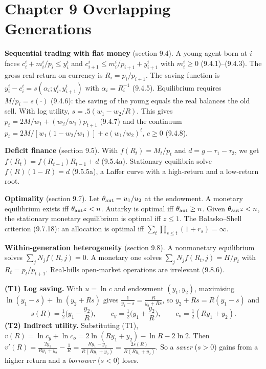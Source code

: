\documentclass[12pt, letterpaper]{article}
\begin{document}
\tableofcontents
\newpage

\section{Chapter 9 \quad Overlapping Generations}

\begin{tcolorbox}[theorybox,title={Chapter 9 Overview}]
\textbf{Sequential trading with fiat money} (section 9.4). A young agent born at $i$ faces
$c_i^i+m_i^i/p_i\le y_i^i$ and $c_{i+1}^i\le m_i^i/p_{i+1}+y_{i+1}^i$ with $m_i^i\ge0$ (9.4.1)--(9.4.3).
The gross real return on currency is $R_i=p_i/p_{i+1}$. The saving function is
$y_i^i-c_i^i=s(\alpha_i;y_i^i,y_{i+1}^i)$ with $\alpha_i=R_i^{-1}$ (9.4.5). Equilibrium requires
$M/p_i=s(\cdot)$ (9.4.6): the saving of the young equals the real balances the old sell. With log
utility, $s=.5(w_1-w_2/R)$. This gives $p_t=2M/w_1+(w_2/w_1)p_{t+1}$ (9.4.7) and the continuum
$p_t=2M/[w_1(1-w_2/w_1)]+c(w_1/w_2)^t$, $c\ge0$ (9.4.8).

\textbf{Deficit finance} (section 9.5). With $f(R_t)=M_t/p_t$ and $d=g-\tau_1-\tau_2$, we get
$f(R_t)=f(R_{t-1})R_{t-1}+d$ (9.5.4a). Stationary equilibria solve $f(R)(1-R)=d$ (9.5.5a), a Laffer
curve with a high-return and a low-return root.

\textbf{Optimality} (section 9.7). Let $\theta_{\rm aut}=u_1/u_2$ at the endowment. A monetary
equilibrium exists iff $\theta_{\rm aut}z<n$. Autarky is optimal iff $\theta_{\rm aut}\ge n$. Given
$\theta_{\rm aut}z<n$, the stationary monetary equilibrium is optimal iff $z\le1$. The Balasko--Shell
criterion (9.7.18): an allocation is optimal iff $\sum_t\prod_{s\le t}(1+r_s)=\infty$.

\textbf{Within-generation heterogeneity} (section 9.8). A nonmonetary equilibrium solves
$\sum_jN_jf(R,j)=0$. A monetary one solves $\sum_jN_jf(R_t,j)=H/p_t$ with $R_t=p_t/p_{t+1}$. Real-bills
open-market operations are irrelevant (9.8.6).
\end{tcolorbox}

\begin{tcolorbox}[theorybox,title={Two tools used repeatedly}]
\textbf{(T1) Log saving.} With $u=\ln c$ and endowment $(y_1,y_2)$, maximising
$\ln(y_1-s)+\ln(y_2+Rs)$ gives $\frac1{y_1-s}=\frac{R}{y_2+Rs}$, so
$y_2+Rs=R(y_1-s)$ and
\[
s(R)=\tfrac12\Big(y_1-\frac{y_2}{R}\Big),\qquad c_y=\tfrac12\Big(y_1+\frac{y_2}{R}\Big),\qquad c_o=\tfrac12(Ry_1+y_2).
\]
\textbf{(T2) Indirect utility.} Substituting (T1), $v(R)=\ln c_y+\ln c_o=2\ln(Ry_1+y_2)-\ln R-2\ln2$.
Then $v'(R)=\frac{2y_1}{Ry_1+y_2}-\frac1R=\frac{Ry_1-y_2}{R(Ry_1+y_2)}=\frac{2s(R)}{R(Ry_1+y_2)}$.
So a \emph{saver} ($s>0$) gains from a higher return and a \emph{borrower} ($s<0$) loses.
\end{tcolorbox}
\end{document}

